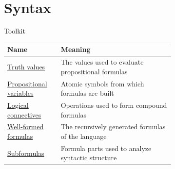 \section{Syntax}

\begin{toolkitbox}{Toolkit}
\small
\begin{tabular}{l p{0.68\linewidth}}
\toprule
\textbf{Name} & \textbf{Meaning} \\
\midrule
\hyperref[def:truth-value-propositional-logic]{Truth values} & The values used to evaluate propositional formulas \\
\hyperref[def:propositional-variable]{Propositional variables} & Atomic symbols from which formulas are built \\
\hyperref[def:logical-connective]{Logical connectives} & Operations used to form compound formulas \\
\hyperref[def:well-formed-formula]{Well-formed formulas} & The recursively generated formulas of the language \\
\hyperref[def:subformula-propositional-logic]{Subformulas} & Formula parts used to analyze syntactic structure \\
\bottomrule
\end{tabular}
\end{toolkitbox}


